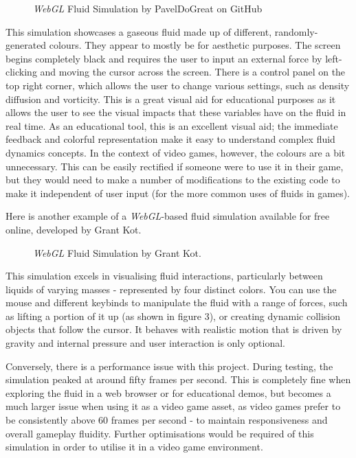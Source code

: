 \documentclass[12pt]{article}
\newcommand{\wideimage}[2][]{%
  \makebox[\textwidth][c]{\texttt{[image: \#2]}}%
}
\begin{document}
    \begin{figure}[H]
        \noindent\wideimage[]{webGLGas.png}
        \caption{\textit{WebGL} Fluid Simulation by PavelDoGreat on GitHub \cite{webgl1}}
    \end{figure}

    This simulation showcases a gaseous fluid made up of different, randomly-generated colours. They appear to mostly be for aesthetic purposes. The screen begins completely black and requires the user to input an external force by left-clicking and moving the cursor across the screen. There is a control panel on the top right corner, which allows the user to change various settings, such as density diffusion and vorticity. This is a great visual aid for educational purposes as it allows the user to see the visual impacts that these variables have on the fluid in real time. As an educational tool, this is an excellent visual aid; the immediate feedback and colorful representation make it easy to understand complex fluid dynamics concepts. In the context of video games, however, the colours are a bit unnecessary. This can be easily rectified if someone were to use it in their game, but they would need to make a number of modifications to the existing code to make it independent of user input (for the more common uses of fluids in games).

    Here is another example of a \textit{WebGL}-based fluid simulation available for free online, developed by Grant Kot.

    \begin{figure}[H]
        \noindent\wideimage[]{webGLParticles.png}
        \caption{\textit{WebGL} Fluid Simulation by Grant Kot. \cite{webgl2}}
    \end{figure}
    
    This simulation excels in visualising fluid interactions, particularly between liquids of varying masses - represented by four distinct colors. You can use the mouse and different keybinds to manipulate the fluid with a range of forces, such as lifting a portion of it up (as shown in figure 3), or creating dynamic collision objects that follow the cursor. It behaves with realistic motion that is driven by gravity and internal pressure and user interaction is only optional.

    Conversely, there is a performance issue with this project. During testing, the simulation peaked at around fifty frames per second. This is completely fine when exploring the fluid in a web browser or for educational demos, but becomes a much larger issue when using it as a video game asset, as video games prefer to be consistently above 60 frames per second - to maintain responsiveness and overall gameplay fluidity. Further optimisations would be required of this simulation in order to utilise it in a video game environment.
\end{document}
